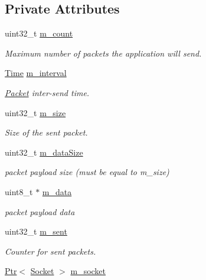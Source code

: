 \subsection*{Private Attributes}
\begin{DoxyCompactItemize}
\item 
uint32\+\_\+t \hyperlink{classns3_1_1UdpEchoClient_a710824f60e09811300bd9196bd858ba1}{m\+\_\+count}
\begin{DoxyCompactList}\small\item\em Maximum number of packets the application will send. \end{DoxyCompactList}\item 
\hyperlink{classns3_1_1Time}{Time} \hyperlink{classns3_1_1UdpEchoClient_a15b358eed30957c2f6febcb989b1eb59}{m\+\_\+interval}
\begin{DoxyCompactList}\small\item\em \hyperlink{classns3_1_1Packet}{Packet} inter-\/send time. \end{DoxyCompactList}\item 
uint32\+\_\+t \hyperlink{classns3_1_1UdpEchoClient_a5d4e4cd4fc2479c9b87207c9bbc4b7c8}{m\+\_\+size}
\begin{DoxyCompactList}\small\item\em Size of the sent packet. \end{DoxyCompactList}\item 
uint32\+\_\+t \hyperlink{classns3_1_1UdpEchoClient_aea0cf40ebfcf21668f3c341d78877f57}{m\+\_\+data\+Size}
\begin{DoxyCompactList}\small\item\em packet payload size (must be equal to m\+\_\+size) \end{DoxyCompactList}\item 
uint8\+\_\+t $\ast$ \hyperlink{classns3_1_1UdpEchoClient_a960048a7dc6bd0bae92a4ff7aa4d148b}{m\+\_\+data}
\begin{DoxyCompactList}\small\item\em packet payload data \end{DoxyCompactList}\item 
uint32\+\_\+t \hyperlink{classns3_1_1UdpEchoClient_a9a8b3a88052659d2f169b2776a939723}{m\+\_\+sent}
\begin{DoxyCompactList}\small\item\em Counter for sent packets. \end{DoxyCompactList}\item 
\hyperlink{classns3_1_1Ptr}{Ptr}$<$ \hyperlink{classns3_1_1Socket}{Socket} $>$ \hyperlink{classns3_1_1UdpEchoClient_a3742503e4126bff0e0498ffdf7d84533}{m\+\_\+socket}

\end{DoxyCompactItemize}
